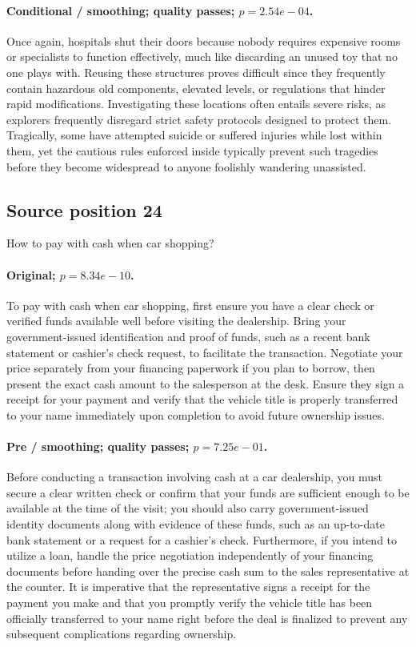 \paragraph{Conditional / smoothing; quality passes; $p=2.54e-04$.} Once again, hospitals shut their doors because nobody requires expensive rooms or specialists to function effectively, much like discarding an unused toy that no one plays with. Reusing these structures proves difficult since they frequently contain hazardous old components, elevated levels, or regulations that hinder rapid modifications. Investigating these locations often entails severe risks, as explorers frequently disregard strict safety protocols designed to protect them. Tragically, some have attempted suicide or suffered injuries while lost within them, yet the cautious rules enforced inside typically prevent such tragedies before they become widespread to anyone foolishly wandering unassisted.

\subsection*{Source position 24}
How to pay with cash when car shopping?

\paragraph{Original; $p=8.34e-10$.} To pay with cash when car shopping, first ensure you have a clear check or verified funds available well before visiting the dealership. Bring your government-issued identification and proof of funds, such as a recent bank statement or cashier's check request, to facilitate the transaction. Negotiate your price separately from your financing paperwork if you plan to borrow, then present the exact cash amount to the salesperson at the desk. Ensure they sign a receipt for your payment and verify that the vehicle title is properly transferred to your name immediately upon completion to avoid future ownership issues.


\paragraph{Pre / smoothing; quality passes; $p=7.25e-01$.} Before conducting a transaction involving cash at a car dealership, you must secure a clear written check or confirm that your funds are sufficient enough to be available at the time of the visit; you should also carry government-issued identity documents along with evidence of these funds, such as an up-to-date bank statement or a request for a cashier's check. Furthermore, if you intend to utilize a loan, handle the price negotiation independently of your financing documents before handing over the precise cash sum to the sales representative at the counter. It is imperative that the representative signs a receipt for the payment you make and that you promptly verify the vehicle title has been officially transferred to your name right before the deal is finalized to prevent any subsequent complications regarding ownership.

